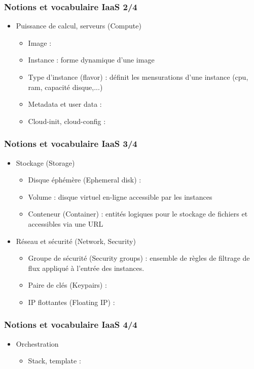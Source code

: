   \begin{frame}
    \frametitle{Notions et vocabulaire IaaS 2/4}
    \begin{itemize}
      \item Puissance de calcul, serveurs (Compute)
      \begin{itemize}
        \item Image : \pause
        \item Instance : \pause forme dynamique d'une image
        \item Type d'instance (flavor) : \pause définit les mensurations d'une instance (cpu, ram, capacité disque,...)
        \item Metadata et user data : \pause
        \item Cloud-init, cloud-config : \pause
      \end{itemize}
    \end{itemize}
  \end{frame}

  \begin{frame}
    \frametitle{Notions et vocabulaire IaaS 3/4}
    \begin{itemize}
      \item Stockage (Storage)
      \begin{itemize}
        \item Disque éphémère (Ephemeral disk) : \pause
        \item Volume : \pause disque virtuel en-ligne accessible par les instances
        \item Conteneur (Container) : \pause entités logiques pour le stockage de fichiers et accessibles via une URL
      \end{itemize}
      \item Réseau et sécurité (Network, Security)
      \begin{itemize}
        \item Groupe de sécurité (Security groups) : \pause ensemble de règles de filtrage de flux appliqué à l'entrée des instances.
        \item Paire de clés (Keypairs) : \pause
        \item IP flottantes (Floating IP) : \pause
      \end{itemize}
    \end{itemize}
  \end{frame}

  \begin{frame}
    \frametitle{Notions et vocabulaire IaaS 4/4}
    \begin{itemize}
      \item Orchestration
      \begin{itemize}
        \item Stack, template : \pause
      \end{itemize}
    \end{itemize}
  \end{frame}

